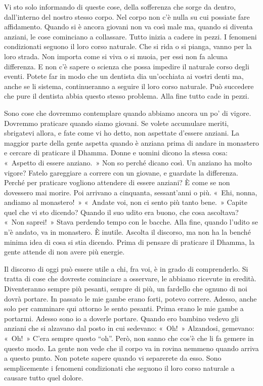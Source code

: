 Vi sto solo informando di queste cose, della sofferenza che sorge da
dentro, dall'interno del nostro stesso corpo. Nel corpo non c'è nulla su
cui possiate fare affidamento. Quando si è ancora giovani non va così
male ma, quando si diventa anziani, le cose cominciano a collassare.
Tutto inizia a cadere in pezzi. I fenomeni condizionati seguono il loro
corso naturale. Che si rida o si pianga, vanno per la loro strada. Non
importa come si viva o si muoia, per essi non fa alcuna differenza. E
non c'è sapere o scienza che possa impedire il naturale corso degli
eventi. Potete far in modo che un dentista dia un'occhiata ai vostri
denti ma, anche se li sistema, continueranno a seguire il loro corso
naturale. Può succedere che pure il dentista abbia questo stesso
problema. Alla fine tutto cade in pezzi.

Sono cose che dovremmo contemplare quando abbiamo ancora un po' di
vigore. Dovremmo praticare quando siamo giovani. Se volete accumulare
meriti, sbrigatevi allora, e fate come vi ho detto, non aspettate
d'essere anziani. La maggior parte della gente aspetta quando è anziana
prima di andare in monastero e cercare di praticare il Dhamma. Donne e
uomini dicono la stessa cosa: «~Aspetto di essere anziano.~» Non so
perché dicano così. Un anziano ha molto vigore? Fatelo gareggiare a
correre con un giovane, e guardate la differenza. Perché per praticare
vogliono attendere di essere anziani? È come se non dovessero mai
morire. Poi arrivano a cinquanta, sessant'anni o più. «~Ehi, nonna,
andiamo al monastero!~» «~Andate voi, non ci sento più tanto bene.~»
Capite quel che vi sto dicendo? Quando il suo udito era buono, che cosa
ascoltava? «~Non saprei!~» Stava perdendo tempo con le bacche. Alla
fine, quando l'udito se n'è andato, va in monastero. È inutile. Ascolta
il discorso, ma non ha la benché minima idea di cosa si stia dicendo.
Prima di pensare di praticare il Dhamma, la gente attende di non avere
più energie.

\enlargethispage{-\baselineskip}

Il discorso di oggi può essere utile a chi, fra voi, è in grado di
comprenderlo. Si tratta di cose che dovreste cominciare a osservare, le
abbiamo ricevute in eredità. Diventeranno sempre più pesanti, sempre di
più, un fardello che ognuno di noi dovrà portare. In passato le mie
gambe erano forti, potevo correre. Adesso, anche solo per camminare qui
attorno le sento pesanti. Prima erano le mie gambe a portarmi. Adesso
sono io a doverle portare. Quando ero bambino vedevo gli anziani che si
alzavano dal posto in cui sedevano: «~Oh!~» Alzandosi, gemevano: «~Oh!~»
C'era sempre questo ``oh''. Però, non sanno che cos'è che li fa gemere
in questo modo. La gente non vede che il corpo va in rovina nemmeno
quando arriva a questo punto. Non potete sapere quando vi separerete da
esso. Sono semplicemente i fenomeni condizionati che seguono il loro
corso naturale a causare tutto quel dolore.

